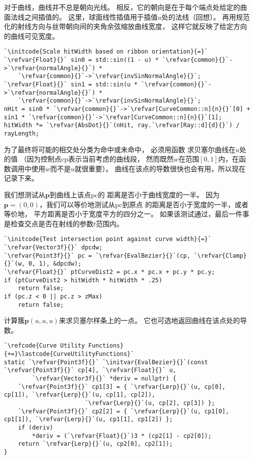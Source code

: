 对于曲线，曲线并不总是朝向光线。
相反，它的朝向是在于每个端点处给定的曲面法线之间插值的。
这里，球面线性插值用于插值$u$处的法线（回想）。
再用规范化的射线方向与丝带朝向间的夹角余弦缩放曲线宽度，
这样它就反映了给定方向的曲线可见宽度。
\begin{lstlisting}
`\initcode{Scale hitWidth based on ribbon orientation}{=}`
`\refvar{Float}{}` sin0 = std::sin((1 - u) * `\refvar{common}{}`->`\refvar{normalAngle}{}`) *
    `\refvar{common}{}`->`\refvar{invSinNormalAngle}{}`;
`\refvar{Float}{}` sin1 = std::sin(u * `\refvar{common}{}`->`\refvar{normalAngle}{}`) *
    `\refvar{common}{}`->`\refvar{invSinNormalAngle}{}`;
nHit = sin0 * `\refvar{common}{}`->`\refvar[CurveCommon::n]{n}{}`[0] + sin1 * `\refvar{common}{}`->`\refvar[CurveCommon::n]{n}{}`[1];
hitWidth *= `\refvar{AbsDot}{}`(nHit, ray.`\refvar[Ray::d]{d}{}`) / rayLength;
\end{lstlisting}

为了最终将可能的相交处分类为命中或未命中，
必须用函数
求贝塞尔曲线在$u$处的值
（因为控制点{\ttfamily cp}表示当前考虑的曲线段，
然而既然$w$在范围$[0,1]$内，在函数调用中使用$w$而不是$u$就很重要）。
曲线在该点的导数很快也会有用，所以现在记录下来。

我们想测试从$\bm p$到曲线上该点{\ttfamily pc}的
距离是否小于曲线宽度的一半。
因为$\bm p=(0,0)$，我们可以等价地测试从{\ttfamily pc}到原点
的距离是否小于宽度的一半，或者等价地，
平方距离是否小于宽度平方的四分之一。
如果该测试通过，最后一件事是检查交点是否在射线的参数$t$范围内。
\begin{lstlisting}
`\initcode{Test intersection point against curve width}{=}`
`\refvar{Vector3f}{}` dpcdw;
`\refvar{Point3f}{}` pc = `\refvar{EvalBezier}{}`(cp, `\refvar{Clamp}{}`(w, 0, 1), &dpcdw);
`\refvar{Float}{}` ptCurveDist2 = pc.x * pc.x + pc.y * pc.y;
if (ptCurveDist2 > hitWidth * hitWidth * .25)
    return false;
if (pc.z < 0 || pc.z > zMax)
    return false;
\end{lstlisting}

计算簇$\bm p(u,u,u)$来求贝塞尔样条上的一点。
它也可选地返回曲线在该点处的导数。
\begin{lstlisting}
`\refcode{Curve Utility Functions}{+=}\lastcode{CurveUtilityFunctions}`
static `\refvar{Point3f}{}` `\initvar{EvalBezier}{}`(const `\refvar{Point3f}{}` cp[4], `\refvar{Float}{}` u,
        `\refvar{Vector3f}{}` *deriv = nullptr) {
    `\refvar{Point3f}{}` cp1[3] = { `\refvar{Lerp}{}`(u, cp[0], cp[1]), `\refvar{Lerp}{}`(u, cp[1], cp[2]),
                       `\refvar{Lerp}{}`(u, cp[2], cp[3]) };
    `\refvar{Point3f}{}` cp2[2] = { `\refvar{Lerp}{}`(u, cp1[0], cp1[1]), `\refvar{Lerp}{}`(u, cp1[1], cp1[2]) };
    if (deriv)
        *deriv = (`\refvar{Float}{}`)3 * (cp2[1] - cp2[0]);
    return `\refvar{Lerp}{}`(u, cp2[0], cp2[1]);
}
\end{lstlisting}

